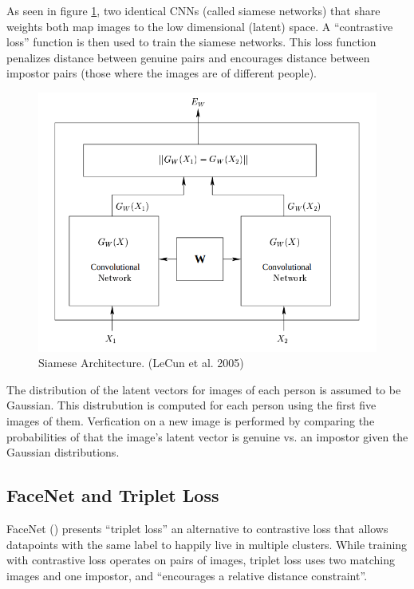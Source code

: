 As seen in figure \ref{fig:siamese}, two identical CNNs (called siamese networks) that share weights both map images to the low dimensional (latent) space.
A ``contrastive loss'' function is then used to train the siamese networks.
This loss function penalizes distance between genuine pairs and encourages distance between impostor pairs (those where the images are of different people)\cite{LeCun}.
\begin{figure}[h]
    \begin{center}
        \includegraphics[width=0.8\linewidth]{siamese_architecture.png}
    \end{center}
    \caption{Siamese Architecture. (LeCun et al. 2005)}
    \label{fig:siamese}
\end{figure}

The distribution of the latent vectors for images of each person is assumed to be Gaussian.
This distrubution is computed for each person using the first five images of them.
Verfication on a new image is performed by comparing the probabilities of that the image's latent vector is genuine vs. an impostor given the Gaussian distributions\cite{LeCun}.


\subsection{FaceNet and Triplet Loss} %

FaceNet (\cite{triple_loss}) presents ``triplet loss'' an alternative to contrastive loss that allows datapoints with the same label to happily live in multiple clusters.
While training with contrastive loss operates on pairs of images, triplet loss uses two matching images and one impostor, and ``encourages a relative distance constraint''\cite{face_net}.


